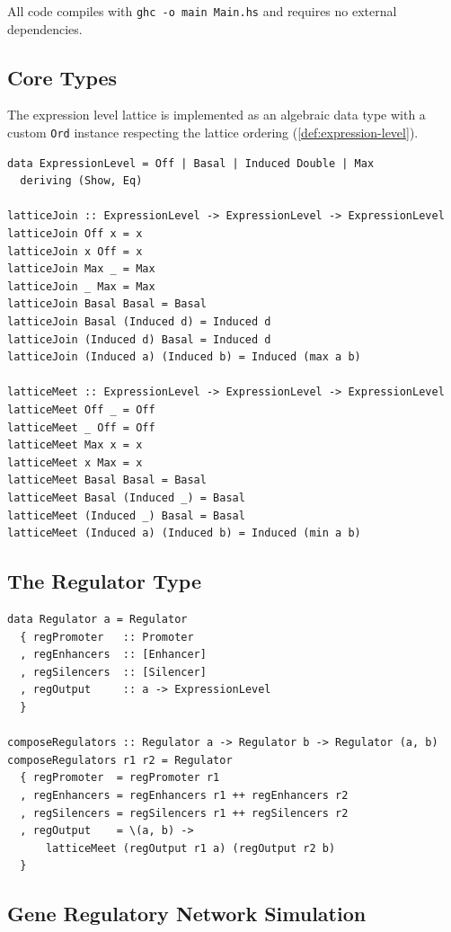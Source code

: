 \documentclass[12pt,a4paper]{article}
\begin{document}
All code compiles with \texttt{ghc -o main Main.hs} and requires no external dependencies.

\subsection{Core Types}

The expression level lattice is implemented as an algebraic data type with a custom \texttt{Ord} instance respecting the lattice ordering (\cref{def:expression-level}).

\begin{lstlisting}[caption={Expression level with lattice operations}]
data ExpressionLevel = Off | Basal | Induced Double | Max
  deriving (Show, Eq)

latticeJoin :: ExpressionLevel -> ExpressionLevel -> ExpressionLevel
latticeJoin Off x = x
latticeJoin x Off = x
latticeJoin Max _ = Max
latticeJoin _ Max = Max
latticeJoin Basal Basal = Basal
latticeJoin Basal (Induced d) = Induced d
latticeJoin (Induced d) Basal = Induced d
latticeJoin (Induced a) (Induced b) = Induced (max a b)

latticeMeet :: ExpressionLevel -> ExpressionLevel -> ExpressionLevel
latticeMeet Off _ = Off
latticeMeet _ Off = Off
latticeMeet Max x = x
latticeMeet x Max = x
latticeMeet Basal Basal = Basal
latticeMeet Basal (Induced _) = Basal
latticeMeet (Induced _) Basal = Basal
latticeMeet (Induced a) (Induced b) = Induced (min a b)
\end{lstlisting}

\subsection{The Regulator Type}

\begin{lstlisting}[caption={Regulator type with composition}]
data Regulator a = Regulator
  { regPromoter   :: Promoter
  , regEnhancers  :: [Enhancer]
  , regSilencers  :: [Silencer]
  , regOutput     :: a -> ExpressionLevel
  }

composeRegulators :: Regulator a -> Regulator b -> Regulator (a, b)
composeRegulators r1 r2 = Regulator
  { regPromoter  = regPromoter r1
  , regEnhancers = regEnhancers r1 ++ regEnhancers r2
  , regSilencers = regSilencers r1 ++ regSilencers r2
  , regOutput    = \(a, b) ->
      latticeMeet (regOutput r1 a) (regOutput r2 b)
  }
\end{lstlisting}

\subsection{Gene Regulatory Network Simulation}
\end{document}
